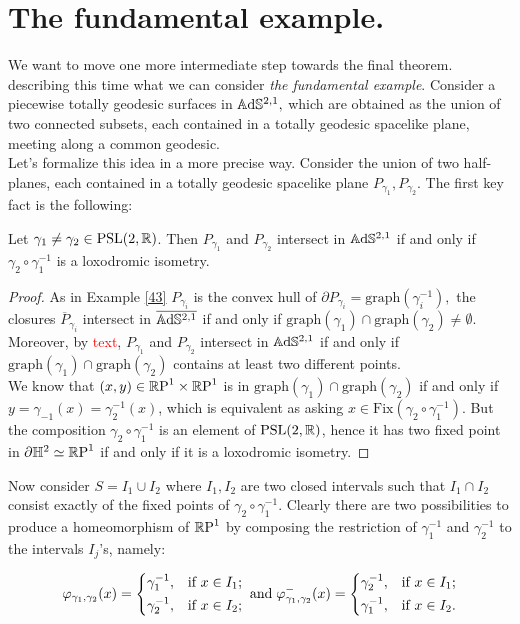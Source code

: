 \section{The fundamental example.} We want to move one more intermediate step towards the final theorem. describing this time what we can consider \textit{the fundamental example}. Consider a piecewise totally geodesic surfaces in $\A^{2,1},$ which are obtained as the union of two connected subsets, each contained in a totally geodesic spacelike plane, meeting along a common geodesic. \\
Let's formalize this idea in a more precise way. Consider the union of two half-planes, each contained in a totally geodesic spacelike plane $P_{\gamma_1},P_{\gamma_2}$. The first key fact is the following:

\begin{lemma}\label{Mati}
    Let $\gamma_1\neq\gamma_2\in\PSL$. Then $P_{\gamma_1}$ and $P_{\gamma_2}$ intersect in $\A^{2,1}$ if and only if $\gamma_2\circ{\gamma_1^{-1}}$ is a loxodromic isometry. 
\end{lemma}
\begin{proof}
    As in Example \ref{43} $P_{\gamma_i}$ is the convex hull of $\partial P_{\gamma_i}=\text{graph}(\gamma_i^{-1}),$ the closures $\overline{P}_{\gamma_i}$  intersect in $\overline{\A^{2,1}}$ if and only if $\text{graph}(\gamma_1)\cap\text{graph}(\gamma_2)\neq\emptyset$. Moreover, by \textcolor{red}{text}, $P_{\gamma_1}$ and $P_{\gamma_2}$ intersect in $\A^{2,1}$ if and only if $\text{graph}(\gamma_1)\cap\text{graph}(\gamma_2)$ contains at least two different points. \\
    We know that $(x,y)\in\T$ is in $\text{graph}(\gamma_1)\cap\text{graph}(\gamma_2)$ if and only if $y=\gamma_{-1}(x)=\gamma_2^{-1}(x)$, which is equivalent as asking $x\in\text{Fix}(\gamma_2\circ\gamma_1^{-1})$. But the composition $\gamma_2\circ\gamma_1^{-1}$ is an element of $\PSL$, hence it has two fixed point in $\partial\H^2\simeq\S$ if and only if it is a loxodromic isometry.
\end{proof}

Now consider $S=I_1\cup I_2$ where $I_1,I_2$ are two closed intervals such that $I_1\cap I_2$ consist exactly of the fixed points of $\gamma_2\circ\gamma_1^{-1}.$ Clearly there are two possibilities to produce a homeomorphism of $\S$ by composing the restriction of $\gamma_1^{-1}$ and $\gamma_2^{-1}$ to the intervals $I_j$'s, namely: 

\begin{equation}
    \varphi_{\gamma_1,\gamma_2}(x) = \begin{dcases}
        \gamma_1^{-1}, & \text{if } x \in I_1; \\
        \gamma_2^{-1}, & \text{if } x \in I_2;
    \end{dcases}
    \;\text{and}\;
    \varphi^-_{\gamma_1,\gamma_2}(x) = \begin{dcases}
        \gamma_2^{-1}, & \text{if } x \in I_1 ;\\
        \gamma_1^{-1} , & \text{if } x \in I_2.
    \end{dcases}
    \end{equation}
    
